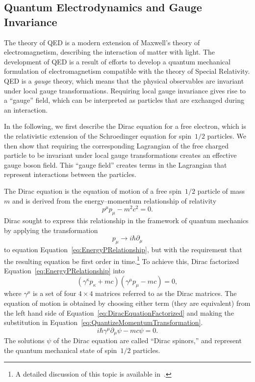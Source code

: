 \subsection{Quantum Electrodynamics and Gauge Invariance}
\label{sec:QEDandGaugeInvariance}
%
The theory of QED is a modern extension of Maxwell's theory of
electromagnetism, describing the interaction of matter with light.  The
development of QED is a result of efforts to develop a quantum mechanical
formulation of electromagnetism compatible with the theory of Special Relativity.
QED is a \emph{gauge} theory, which means that the physical observables are
invariant under local gauge transformations.  Requiring local gauge
invariance gives rise to a ``gauge'' field, which can be interpreted as 
particles that are exchanged during an interaction.  

In the following, we first describe the Dirac equation for a free electron,
which is the relativistic extension of the Schroedinger equation for spin~$1/2$
particles.  We then show that requiring the corresponding Lagrangian of the free
charged particle to be invariant under local gauge transformations creates an
effective gauge boson field.  This ``gauge field'' creates terms in the
Lagrangian that represent interactions between the particles.

The Dirac equation is the equation of motion of a free spin~$1/2$ particle of
mass~$m$ and is derived from the energy--momentum relationship of relativity
\begin{equation}
  p^{\mu}p_\mu - m^2c^2 = 0.
  \label{eq:EnergyPRelationship}
\end{equation}
Dirac sought to express this relationship in the framework of quantum mechanics
by applying the transformation
\begin{equation}
  p_\mu \to i \hbar \partial_\mu 
  \label{eq:QuantizeMomentumTransformation}
\end{equation}
to equation Equation~\ref{eq:EnergyPRelationship}, but with the requirement that
the resulting equation be first order in time.\footnote{A detailed
discussion of this topic is available in~\cite{Griffiths:IntroParticle}.}
To achieve this, Dirac factorized Equation~\ref{eq:EnergyPRelationship} into 
\begin{equation}
  (\gamma^\kappa p_\kappa + mc)(\gamma^\mu p_\mu - mc) = 0,
  \label{eq:DiracEquationFactorized}
\end{equation}
where $\gamma^\mu$ is a set of four $4\times4$ matrices referred to as the Dirac
matrices.  The equation of motion is obtained by choosing either term (they are
equivalent) from the
left hand side of Equation~\ref{eq:DiracEquationFactorized} and
making the substitution in Equation~\ref{eq:QuantizeMomentumTransformation}.
\begin{equation}
  i \hbar \gamma^\mu \partial_\mu \psi - mc \psi = 0.
  \label{eq:DiracEquation}
\end{equation}
The solutions $\psi$ of the Dirac equation are called ``Dirac spinors,'' and
represent the quantum mechanical state of spin~$1/2$ particles.

